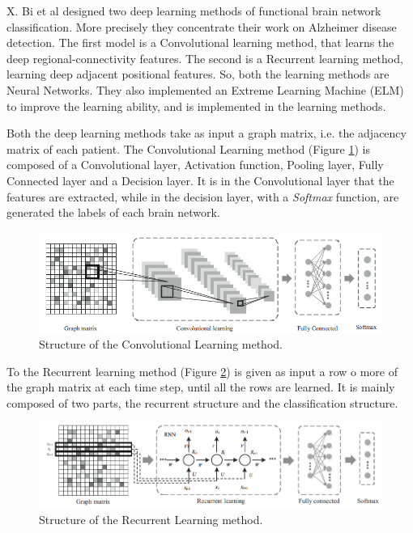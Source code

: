 X. Bi et al \cite{Bi2019FunctionalBN} designed two deep learning methods of functional brain network classification. More precisely they concentrate their work on Alzheimer disease detection. The first model is a Convolutional learning method, that learns the deep regional-connectivity features. The second is a Recurrent learning method, learning deep adjacent positional features. So, both the learning methods are Neural Networks. They also implemented an Extreme Learning Machine (ELM) to improve the learning ability, and is implemented in the learning methods.
\vspace{0.5cm}

Both the deep learning methods take as input a graph matrix, i.e. the adjacency matrix of each patient. 
The Convolutional Learning method (Figure \ref{fig:diagram8}) is composed of a Convolutional layer, Activation function, Pooling layer, Fully Connected layer and a Decision layer. It is in the Convolutional layer that the features are extracted, while in the decision layer, with a \textit{Softmax} function, are generated the labels of each brain network.
\vspace{0.5cm}

\begin{figure}[htbp]
	\centering
	\includegraphics[scale=0.5]{Immagini/functional1.PNG}
	\caption{Structure of the Convolutional Learning method.}
	\label{fig:diagram8}
\end{figure}

To the Recurrent learning method (Figure \ref{fig:diagram9}) is given as input a row o more of the graph matrix at each time step, until all the rows are learned. It is mainly composed of two parts, the recurrent structure and the classification structure. 
\vspace{0.5cm}

\begin{figure}[htbp]
	\centering
	\includegraphics[scale=0.5]{Immagini/functional2.PNG}
	\caption{Structure of the Recurrent Learning method.}
	\label{fig:diagram9}
\end{figure}

